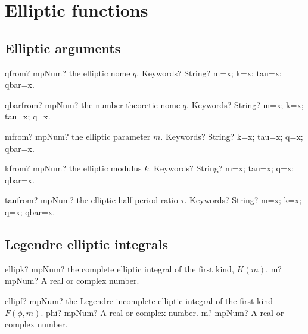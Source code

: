 \documentclass[12pt,a4paper,openany]{book}
\begin{document}
\chapter{Elliptic functions}

\section{Elliptic arguments}

\begin{mpFunctionsExtract}
\mpFunctionOne
{qfrom? mpNum? the elliptic nome $q$.}
{Keywords? String? m=x; k=x; tau=x; qbar=x.}
\end{mpFunctionsExtract}

\begin{mpFunctionsExtract}
\mpFunctionOne
{qbarfrom? mpNum? the number-theoretic nome $\overline{q}$.}
{Keywords? String? m=x; k=x; tau=x; q=x.}
\end{mpFunctionsExtract}

\begin{mpFunctionsExtract}
\mpFunctionOne
{mfrom? mpNum? the elliptic parameter $m$.}
{Keywords? String? k=x; tau=x; q=x; qbar=x.}
\end{mpFunctionsExtract}

\begin{mpFunctionsExtract}
\mpFunctionOne
{kfrom? mpNum? the elliptic modulus $k$.}
{Keywords? String? m=x; tau=x; q=x; qbar=x.}
\end{mpFunctionsExtract}

\begin{mpFunctionsExtract}
\mpFunctionOne
{taufrom? mpNum? the elliptic half-period ratio $\tau$.}
{Keywords? String? m=x; k=x; q=x; qbar=x.}
\end{mpFunctionsExtract}

\section{Legendre elliptic integrals}

\begin{mpFunctionsExtract}
\mpFunctionOne
{ellipk? mpNum? the complete elliptic integral of the first kind, $K(m)$.}
{m? mpNum? A real or complex number.}
\end{mpFunctionsExtract}

\begin{mpFunctionsExtract}
\mpFunctionTwo
{ellipf? mpNum? the Legendre incomplete elliptic integral of the first kind $F(\phi,m)$.}
{phi? mpNum? A real or complex number.}
{m? mpNum? A real or complex number.}
\end{mpFunctionsExtract}
\end{document}
